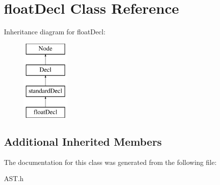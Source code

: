 \hypertarget{classfloatDecl}{\section{float\-Decl Class Reference}
\label{classfloatDecl}
}
Inheritance diagram for float\-Decl\-:\begin{figure}[H]
\begin{center}
\leavevmode
\includegraphics[height=4.000000cm]{classfloatDecl}
\end{center}
\end{figure}
\subsection*{Additional Inherited Members}


The documentation for this class was generated from the following file\-:\begin{DoxyCompactItemize}
\item 
A\-S\-T.\-h\end{DoxyCompactItemize}
